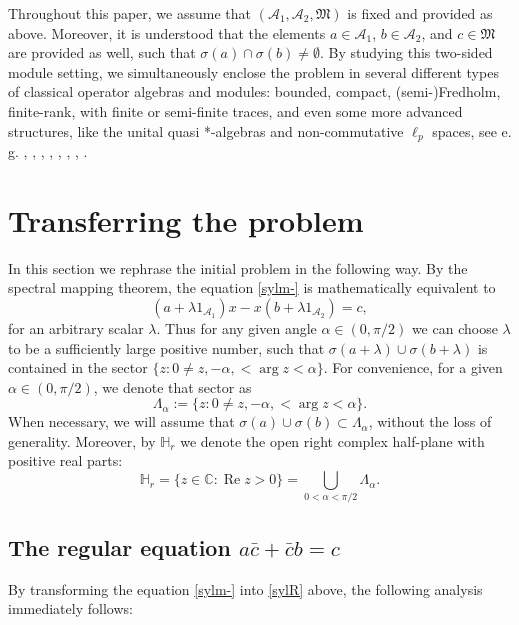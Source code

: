 \documentclass{article}
\theoremstyle{definition}
\renewcommand{\Re}{\operatorname{Re}}
\def\A{{\mathcal{A}}}
\def\M{\mathfrak{M}}
\def\CC{\mathbb{C}}
\def\HR{\mathbb{H}_r}
\begin{document}
Throughout this paper, we assume that $(\A_1,\A_2,\M)$ is fixed and provided as above.  Moreover, it is understood that the elements $a\in\A_1$, $b\in\A_2$, and $c\in\M$ are provided as well, such that $\sigma(a)\cap\sigma(b)\neq\emptyset$. By studying this two-sided module setting, we simultaneously enclose the problem in several different types of classical operator algebras and modules: bounded, compact, (semi-)Fredholm, finite-rank, with finite or semi-finite traces, and even some more advanced structures, like the unital quasi *-algebras and non-commutative $\ell_p$ spaces, see e. g. \cite{Trap}, \cite{BDI}, \cite{BIT}, \cite{Bel}, \cite{JB}, \cite{BDZG},  \cite{DS}, \cite{VM}.

\section{Transferring the problem}\label{transfer}

In this section we rephrase the initial problem in the following way. By the spectral mapping theorem, the equation \eqref{sylm-} is mathematically equivalent to
\begin{equation}
\label{sylR}
(a+\lambda 1_{\A_1})x-x(b+\lambda 1_{\A_2})=c,
\end{equation}
for an arbitrary scalar $\lambda$. Thus for any given  angle $\alpha\in(0,\pi/2)$ we can choose $\lambda$ to be a sufficiently large positive number, such that $\sigma(a+\lambda)\cup\sigma(b+\lambda)$ is contained in the sector
$\{z:0\neq z, -\alpha,<\arg z<\alpha\}$. For convenience, for a given $\alpha\in(0,\pi/2)$, we denote that sector as
$$\Lambda_\alpha:=\{z:0\neq z, -\alpha,<\arg z<\alpha\}.$$
When necessary, we will assume that $\sigma(a)\cup\sigma(b)\subset\Lambda_\alpha$, without the loss of generality. Moreover, by $\HR$ we denote the open right complex half-plane with positive real parts:
$$\HR=\{z\in\CC: \Re z>0\}=\bigcup_{0<\alpha<\pi/2}\Lambda_\alpha.$$

\subsection{The regular equation $a\bar{c}+\bar{c}b=c$}

By transforming the equation \eqref{sylm-} into \eqref{sylR} above,  the following analysis immediately follows:
\end{document}
